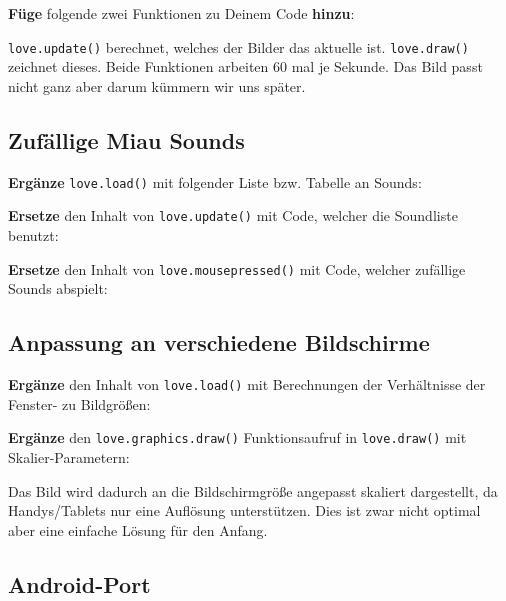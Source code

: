 \documentclass[a4paper, 11pt]{article}
\begin{document}


\textbf{Füge} folgende zwei Funktionen zu Deinem Code \textbf{hinzu}:



\texttt{love.update()} berechnet, welches der Bilder das aktuelle ist. \texttt{love.draw()} zeichnet dieses. Beide Funktionen arbeiten 60 mal je Sekunde. Das Bild passt nicht ganz aber darum kümmern wir uns später.

\subsection{Zufällige Miau Sounds}

\textbf{Ergänze} \texttt{love.load()} mit folgender Liste bzw. Tabelle an Sounds:



\textbf{Ersetze} den Inhalt von \texttt{love.update()} mit Code, welcher die Soundliste benutzt:



\textbf{Ersetze} den Inhalt von \texttt{love.mousepressed()} mit Code, welcher zufällige Sounds abspielt:



\subsection{Anpassung an verschiedene Bildschirme}

\textbf{Ergänze} den Inhalt von \texttt{love.load()} mit Berechnungen der Verhältnisse der Fenster- zu Bildgrößen:



\textbf{Ergänze} den \texttt{love.graphics.draw()} Funktionsaufruf in \texttt{love.draw()} mit Skalier-Parametern:



Das Bild wird dadurch an die Bildschirmgröße angepasst skaliert dargestellt, da Handys/Tablets nur eine Auflösung unterstützen. Dies ist zwar nicht optimal aber eine einfache Lösung für den Anfang.

\subsection{Android-Port} \label{androidport}
\end{document}
